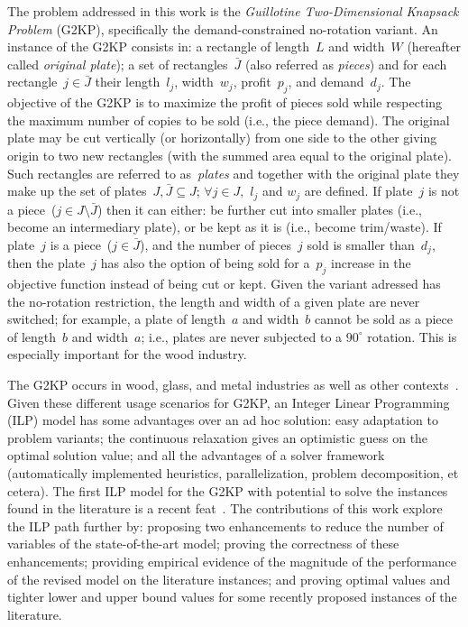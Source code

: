 The problem addressed in this work is the \emph{Guillotine Two-Dimensional Knapsack Problem} (G2KP), specifically the demand-constrained no-rotation variant.
An instance of the G2KP consists in: a rectangle of length~\(L\) and width~\(W\) (hereafter called \emph{original plate}); a set of rectangles~\(\bar{J}\) (also referred as \emph{pieces}) and for each rectangle~\(j \in \bar{J}\) their length~\(l_j\), width~\(w_j\), profit~\(p_j\), and demand~\(d_j\).
The objective of the G2KP is to maximize the profit of pieces sold while respecting the maximum number of copies to be sold (i.e., the piece demand).
The original plate may be cut vertically (or horizontally) from one side to the other giving origin to two new rectangles (with the summed area equal to the original plate).
Such rectangles are referred to as~\emph{plates} and together with the original plate they make up the set of plates~\(J, \bar{J} \subseteq J\); \(\forall j \in J, \) \(l_j\) and \(w_j\) are defined.
If plate~\(j\) is not a piece~(\(j \in J\setminus\bar{J}\)) then it can either: be further cut into smaller plates (i.e., become an intermediary plate), or be kept as it is (i.e., become trim/waste).
If plate~\(j\) is a piece~(\(j \in \bar{J}\)), and the number of pieces~\(j\) sold is smaller than~\(d_j\), then the plate~\(j\) has also the option of being sold for a~\(p_j\) increase in the objective function instead of being cut or kept.
Given the variant adressed has the no-rotation restriction, the length and width of a given plate are never switched; for example, a plate of length~\(a\) and width~\(b\) cannot be sold as a piece of length~\(b\) and width~\(a\); i.e., plates are never subjected to a \(90^\circ\) rotation. This is especially important for the wood industry.

The G2KP occurs in wood, glass, and metal industries as well as other contexts~\cite[p. 6]{dimitri_thesis}.
Given these different usage scenarios for G2KP, an Integer Linear Programming (ILP) model has some advantages over an ad hoc solution: easy adaptation to problem variants; the continuous relaxation gives an optimistic guess on the optimal solution value; and all the advantages of a solver framework (automatically implemented heuristics, parallelization, problem decomposition, et cetera).
The first ILP model for the G2KP with potential to solve the instances found in the literature is a recent feat~\cite{furini:2016}.
The contributions of this work explore the ILP path further by: proposing two enhancements to reduce the number of variables of the state-of-the-art model; proving the correctness of these enhancements; providing empirical evidence of the magnitude of the performance of the revised model on the literature instances; and proving optimal values and tighter lower and upper bound values for some recently proposed instances of the literature.


